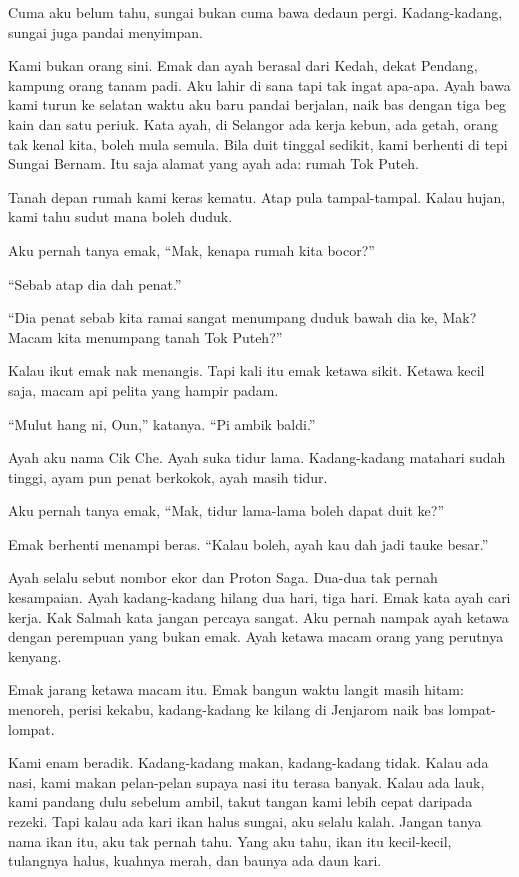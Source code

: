 \documentclass[
  11pt,
  a5paper,
  openany,
  oneside]{book}
\begin{document}
Cuma aku belum tahu, sungai bukan cuma bawa dedaun pergi. Kadang-kadang,
sungai juga pandai menyimpan.

Kami bukan orang sini. Emak dan ayah berasal dari Kedah, dekat Pendang,
kampung orang tanam padi. Aku lahir di sana tapi tak ingat apa-apa. Ayah
bawa kami turun ke selatan waktu aku baru pandai berjalan, naik bas
dengan tiga beg kain dan satu periuk. Kata ayah, di Selangor ada kerja
kebun, ada getah, orang tak kenal kita, boleh mula semula. Bila duit
tinggal sedikit, kami berhenti di tepi Sungai Bernam. Itu saja alamat
yang ayah ada: rumah Tok Puteh.

Tanah depan rumah kami keras kematu. Atap pula tampal-tampal. Kalau
hujan, kami tahu sudut mana boleh duduk.

Aku pernah tanya emak, ``Mak, kenapa rumah kita bocor?''

``Sebab atap dia dah penat.''

``Dia penat sebab kita ramai sangat menumpang duduk bawah dia ke, Mak?
Macam kita menumpang tanah Tok Puteh?''

Kalau ikut emak nak menangis. Tapi kali itu emak ketawa sikit. Ketawa
kecil saja, macam api pelita yang hampir padam.

``Mulut hang ni, Oun,'' katanya. ``Pi ambik baldi.''

Ayah aku nama Cik Che. Ayah suka tidur lama. Kadang-kadang matahari
sudah tinggi, ayam pun penat berkokok, ayah masih tidur.

Aku pernah tanya emak, ``Mak, tidur lama-lama boleh dapat duit ke?''

Emak berhenti menampi beras. ``Kalau boleh, ayah kau dah jadi tauke
besar.''

Ayah selalu sebut nombor ekor dan Proton Saga. Dua-dua tak pernah
kesampaian. Ayah kadang-kadang hilang dua hari, tiga hari. Emak kata
ayah cari kerja. Kak Salmah kata jangan percaya sangat. Aku pernah
nampak ayah ketawa dengan perempuan yang bukan emak. Ayah ketawa macam
orang yang perutnya kenyang.

Emak jarang ketawa macam itu. Emak bangun waktu langit masih hitam:
menoreh, perisi kekabu, kadang-kadang ke kilang di Jenjarom naik bas
lompat-lompat.

Kami enam beradik. Kadang-kadang makan, kadang-kadang tidak. Kalau ada
nasi, kami makan pelan-pelan supaya nasi itu terasa banyak. Kalau ada
lauk, kami pandang dulu sebelum ambil, takut tangan kami lebih cepat
daripada rezeki. Tapi kalau ada kari ikan halus sungai, aku selalu
kalah. Jangan tanya nama ikan itu, aku tak pernah tahu. Yang aku tahu,
ikan itu kecil-kecil, tulangnya halus, kuahnya merah, dan baunya ada
daun kari.
\end{document}
